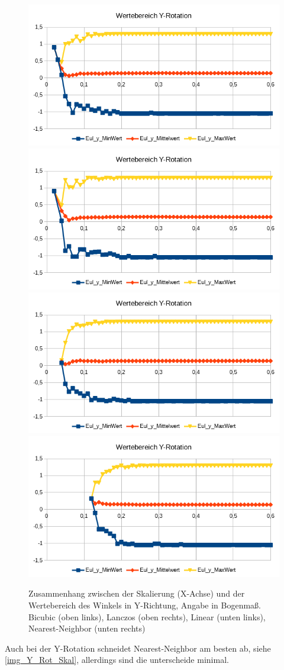 \begin{figure}
	\centering
	\includegraphics[width=0.45\linewidth]{tabelle2/Y_Rot_Val_Cubic}
	\includegraphics[width=0.45\linewidth]{tabelle2/Y_Rot_Val_Lanc}
	\includegraphics[width=0.45\linewidth]{tabelle2/Y_Rot_Val_Linear}
	\includegraphics[width=0.45\linewidth]{tabelle2/Y_Rot_Val_NN}
	\caption{Zusammenhang zwischen der Skalierung (X-Achse) und der Wertebereich des Winkels in Y-Richtung, Angabe in Bogenmaß.
		Bicubic (oben links), Lanczos (oben rechts), Linear (unten links), Nearest-Neighbor (unten rechts)}
	\label{img_Y_Rot_Val_Skal}
\end{figure}
Auch bei der Y-Rotation schneidet Nearest-Neighbor am besten ab, siehe \autoref{img_Y_Rot_Skal}, allerdings sind die unterscheide minimal.\\
